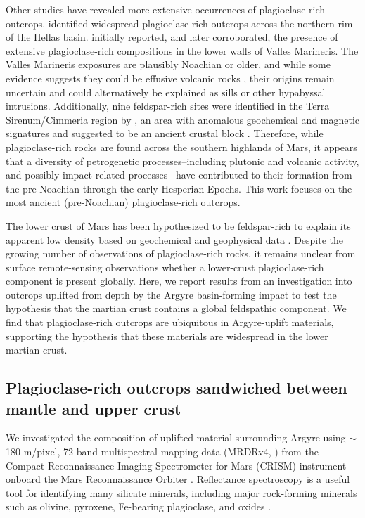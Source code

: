 \documentclass[12pt]{article}
\begin{document}
Other studies have revealed more extensive occurrences of plagioclase-rich outcrops. \citet{Phillips2022} identified widespread plagioclase-rich outcrops across the northern rim of the Hellas basin. \citet{Viviano-Beck2017} initially reported, and \citet{Flahaut2023} later corroborated, the presence of extensive plagioclase-rich compositions in the lower walls of Valles Marineris. The Valles Marineris exposures are plausibly Noachian or older, and while some evidence suggests they could be effusive volcanic rocks \citep{Flahaut2023}, their origins remain uncertain and could alternatively be explained as sills or other hypabyssal intrusions. Additionally, nine feldspar-rich sites were identified in the Terra Sirenum/Cimmeria region by \citet{Payre2022}, an area with anomalous geochemical and magnetic signatures and suggested to be an ancient crustal block \citep{Bouley2020}. Therefore, while plagioclase-rich rocks are found across the southern highlands of Mars, it appears that a diversity of petrogenetic processes--including plutonic and volcanic activity, and possibly impact-related processes \citep{Grieve1991, Hurwitz2014, Vaughan2014, Koeppel2020}--have contributed to their formation from the pre-Noachian through the early Hesperian Epochs. This work focuses on the most ancient (pre-Noachian) plagioclase-rich outcrops.

The lower crust of Mars has been hypothesized to be feldspar-rich to explain its apparent low density based on geochemical and geophysical data \citep{Baratoux2014, Goossens2017, Knapmeyer-Endrun2021}. Despite the growing number of observations of plagioclase-rich rocks, it remains unclear from surface remote-sensing observations whether a lower-crust plagioclase-rich component is present globally. Here, we report results from an investigation into outcrops uplifted from depth by the Argyre basin-forming impact to test the hypothesis that the martian crust contains a global feldspathic component. We find that plagioclase-rich outcrops are ubiquitous in Argyre-uplift materials, supporting the hypothesis that these materials are widespread in the lower martian crust.

\subsection*{Plagioclase-rich outcrops sandwiched between mantle and upper crust}

We investigated the composition of uplifted material surrounding Argyre using $\sim$180 m/pixel, 72-band multispectral mapping data (MRDRv4, \citealt{Seelos2023}) from the Compact Reconnaissance Imaging Spectrometer for Mars (CRISM) instrument onboard the Mars Reconnaissance Orbiter \citep{Murchie2007}. Reflectance spectroscopy is a useful tool for identifying many silicate minerals, including major rock-forming minerals such as olivine, pyroxene, Fe-bearing plagioclase, and oxides \citep{Adams1967, Adams1968, Clark1984}.
\end{document}
